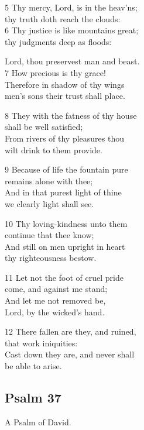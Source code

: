 \begin{multicols}{3}
5 Thy mercy, Lord, is in the heav’ns;\\
thy truth doth reach the clouds:\\
6 Thy justice is like mountains great;\\
thy judgments deep as floods:

Lord, thou preservest man and beast.\\
7 How precious is thy grace!\\
Therefore in shadow of thy wings\\
men’s sons their trust shall place.

8 They with the fatness of thy house\\
shall be well satisfied;\\
From rivers of thy pleasures thou\\
wilt drink to them provide.

9 Because of life the fountain pure\\
remains alone with thee;\\
And in that purest light of thine\\
we clearly light shall see.

10 Thy loving-kindness unto them\\
continue that thee know;\\
And still on men upright in heart\\
thy righteousness bestow.

11 Let not the foot of cruel pride\\
come, and against me stand;\\
And let me not removed be,\\
Lord, by the wicked’s hand.

12 There fallen are they, and ruined,\\
that work iniquities:\\
Cast down they are, and never shall\\
be able to arise.

\begin{center}
\quad{}\quad{}
\end{center}

\subsection*{Psalm 37 }

A Psalm of David.


\end{multicols}
